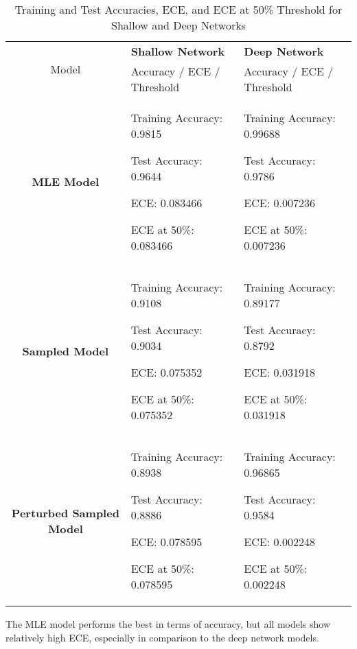 \begin{enumerate}
\begin{enumerate}
    \begin{table}[h!]
    \centering
    \begin{tabular}{|c|p{6cm}|p{6cm}|}
        \hline
        \multirow{2}{*}{Model} & \textbf{Shallow Network} & \textbf{Deep Network} \\
        \cline{2-3}
        & Accuracy / ECE / Threshold & Accuracy / ECE / Threshold \\
        \hline
        \textbf{MLE Model} & 
        Training Accuracy: 0.9815 \par
        Test Accuracy: 0.9644 \par
        ECE: 0.083466 \par
        ECE at 50\%: 0.083466 & 
        Training Accuracy: 0.99688 \par
        Test Accuracy: 0.9786 \par
        ECE: 0.007236 \par
        ECE at 50\%: 0.007236 \\
        \hline
        \textbf{Sampled Model} & 
        Training Accuracy: 0.9108 \par
        Test Accuracy: 0.9034 \par
        ECE: 0.075352 \par
        ECE at 50\%: 0.075352 & 
        Training Accuracy: 0.89177 \par
        Test Accuracy: 0.8792 \par
        ECE: 0.031918 \par
        ECE at 50\%: 0.031918 \\
        \hline
        \textbf{Perturbed Sampled Model} & 
        Training Accuracy: 0.8938 \par
        Test Accuracy: 0.8886 \par
        ECE: 0.078595 \par
        ECE at 50\%: 0.078595 & 
        Training Accuracy: 0.96865 \par
        Test Accuracy: 0.9584 \par
        ECE: 0.002248 \par
        ECE at 50\%: 0.002248 \\
        \hline
    \end{tabular}
    \caption{Training and Test Accuracies, ECE, and ECE at 50\% Threshold for Shallow and Deep Networks}
    \label{tab:accuracy_ece}
\end{table}

The MLE model performs the best in terms of accuracy, but all models show
relatively high ECE, especially in comparison to the deep network models.  


\end{enumerate}
\end{enumerate}
